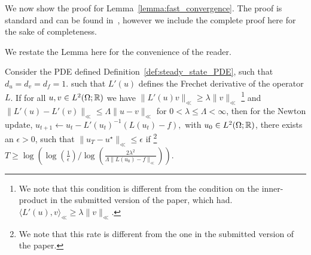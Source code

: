 We now show the proof for Lemma~\ref{lemma:fast_convergence}.
The proof is standard and can be found in~\cite{farago2002numerical}, 
however we include the 
complete proof here for the sake of completeness.


We restate the Lemma here for the convenience of the reader.
\begin{lemma}
    \label{lemma:fast_convergence}
   Consider the PDE defined Definition~\ref{def:steady_state_PDE},
   such that $d_u=d_v=d_f=1$.
   such that $L'(u)$ defines the Frechet derivative 
   of the operator $L$.
   If for all $u,v \in L^2(\Omega; \mathbb{R})$ we have
   $\| L'(u) v\|_{\ll} \geq \lambda \|v\|_{\ll}$
   \footnote{We note that this condition is different from the 
   condition on the inner-product in the submitted version 
   of the paper, which had. 
   $\langle L'(u), v\rangle_{\ll} \geq \lambda \|v\|_{\ll}$.
   }
   and 
   $\|L'(u) - L'(v)\|_{\ll} \leq \Lambda \|u - v\|_{\ll}$
   for $0 < \lambda \leq \Lambda <\infty $,
   then for the Newton update,
   $
       u_{t+1} \leftarrow u_t - L'(u_t)^{-1}\left(L(u_t) - f\right),
   $
   with $u_0 \in L^2(\Omega; \mathbb{R})$, there exists an $\epsilon > 0$,
   such that  $\|u_T - u^\star\|_{\ll} \leq \epsilon$
   if 
    \footnote{We note that this rate is different from the one in 
    the submitted version of the paper. }
    $
       T \geq \log 
       \left(
           \log \left(\frac{1}{\epsilon}\right) 
           /
           \log \left(\frac{2\lambda^2}{\Lambda\|L(u_0) - f\|_{\ll}}\right)
        \right).
    $
\end{lemma}


